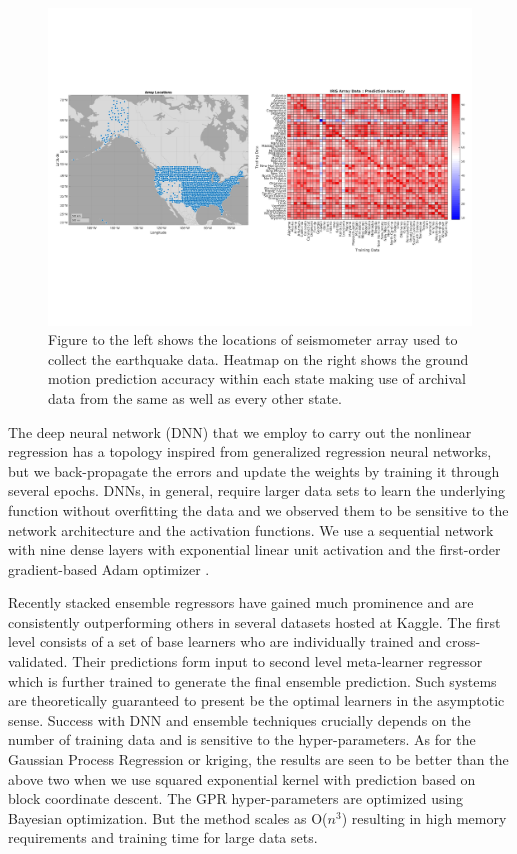 \documentclass[twocolumn, aps, superscriptaddress]{revtex4}
\begin{document}
\begin{figure}[!htb]
 \includegraphics[width=\textwidth]{./plots/USArray_with_HeatMap}
 \caption{Figure to the left shows the locations of seismometer array used to collect the earthquake data. Heatmap on the right shows the ground motion prediction accuracy within each state making use of archival data from the same as well as every other state.}
 \label{fig:map}
\end{figure}


The deep neural network (DNN) that we employ to carry out the nonlinear regression has a topology inspired from generalized regression neural networks\cite{specht1991general}, but we back-propagate the errors and update the weights by training it through several epochs. DNNs, in general, require larger data sets to learn the underlying function without overfitting the data and we observed them to be sensitive to the network architecture and the activation functions. We use a sequential network with nine dense layers with exponential linear unit activation and the first-order gradient-based Adam optimizer \cite{kingma2014adam}.

Recently stacked ensemble regressors have gained much prominence and are consistently outperforming others in several datasets hosted at Kaggle\cite{Kaggle}. The first level consists of a set of base learners who are individually trained and cross-validated. Their predictions form input to second level meta-learner regressor which is further trained to generate the final ensemble prediction.  Such systems are theoretically guaranteed to present be the optimal learners in the asymptotic sense. Success with DNN and ensemble techniques crucially depends on the number of training data and is sensitive to the hyper-parameters. As for the Gaussian Process Regression or kriging, the results are seen to be better than the above two when we use squared exponential kernel with prediction based on block coordinate descent. The GPR hyper-parameters are optimized using Bayesian optimization. But the method scales as O($n^3$) resulting in high memory requirements and training time for large data sets.
\end{document}
